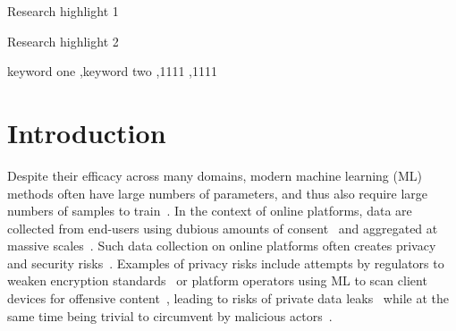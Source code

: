 \documentclass[preprint,12pt]{elsarticle}
\begin{document}
\begin{frontmatter}
\begin{highlights}
\item Research highlight 1
\item Research highlight 2
\end{highlights}

\begin{keyword}
keyword one \sep keyword two
 \sep 1111
 \sep 1111
\end{keyword}

\end{frontmatter}

\linenumbers

\section{Introduction}

Despite their efficacy across many domains, modern machine learning (ML) methods often have large numbers of parameters, and thus also require large numbers of samples to train~\cite{desislavov2021compute}. 
In the context of online platforms, data are collected from end-users using dubious amounts of consent~\cite{nouwens2020dark} and aggregated at massive scales~\cite{desislavov2021compute}. 
Such data collection on online platforms often creates privacy and security risks~\cite{chakraborty_adversarial_2018,meyers}. 
Examples of privacy risks include attempts by regulators to weaken encryption standards~\cite{amnesty_encryption} or platform operators using ML to scan client devices for offensive content~\cite{chat_control}, leading to risks of private data leaks~\cite{xiao2021improving,fredrikson_model_2015} while at the same time being trivial to circumvent by malicious actors~\cite{carlini_towards_2017,dohmatob_generalized_2019,hopskipjump,biggio_evasion_2013,meyers,chakraborty_adversarial_2018,trashfire}. 
\end{document}

